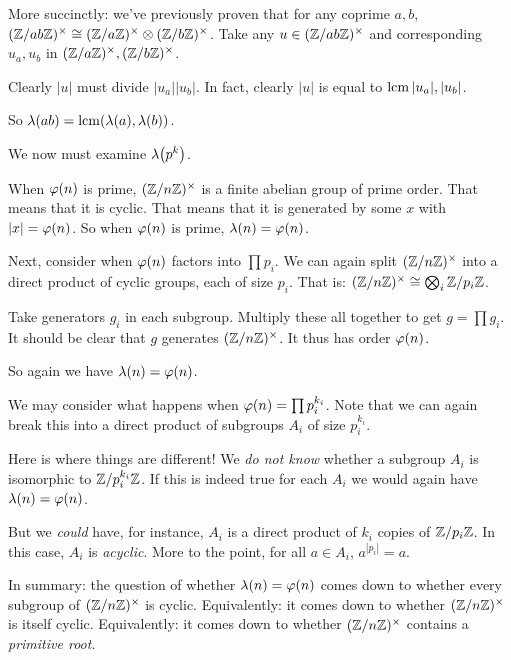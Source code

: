 \begin{remark}
  More succinctly: we've previously proven that for any coprime $a, b$,
  $\Zmodx{ab} \cong \Zmodx{a} \otimes \Zmodx{b}$. Take any $u \in
  \Zmodx{ab}$ and corresponding $u_a, u_b$ in $\Zmodx{a}, \Zmodx{b}$.

  Clearly $|u|$ must divide $|u_a||u_b|$. In fact, clearly $|u|$ is
  equal to $\lcm{|u_a|, |u_b|}$.

  So $\lambdaf{ab} = \lcmf{\lambdaf{a}, \lambdaf{b}}$.
\end{remark}

\begin{remark}
  We now must examine $\lambdaf{p^k}$.
\end{remark}

\begin{remark}
  When $\vphif{n}$ is prime, $\Zmodnx$ is a finite abelian group of
  prime order. That means that it is cyclic. That means that it is
  generated by some $x$ with $|x| = \vphif{n}$. So when $\vphif{n}$ is
  prime, $\lambda(n) = \vphif{n}$.
\end{remark}

\begin{remark}
  Next, consider when $\vphif{n}$ factors into $\prod p_i$. We can
  again split $\Zmodnx$ into a direct product of cyclic groups, each of
  size $p_i$. That is: $\Zmodnx \cong \bigotimes_i \Zmod{p_i}$.

  Take generators $g_i$ in each subgroup. Multiply these all together to
  get $g = \prod g_i$. It should be clear that $g$ generates $\Zmodnx$.
  It thus has order $\vphif{n}$.

  So again we have $\lambda(n) = \vphif{n}$.
\end{remark}

\begin{remark}
  We may consider what happens when $\vphif{n} = \prod p_i^{k_i}$. Note
  that we can again break this into a direct product of subgroups $A_i$
  of size $p_i^{k_i}$.

  Here is where things are different! We \emph{do not know} whether a
  subgroup $A_i$ is isomorphic to $\Zmod{p_i^{k_i}}$. If this is indeed
  true for each $A_i$ we would again have $\lambda(n) = \vphif{n}$.

  But we \emph{could} have, for instance, $A_i$ is a direct product of
  $k_i$ copies of $\Zmod{p_i}$. In this case, $A_i$ is \emph{acyclic}.
  More to the point, for all $a \in A_i$, $a^{|p_i|} = a$.

  In summary: the question of whether $\lambda(n) = \vphif{n}$ comes
  down to whether every subgroup of $\Zmodnx$ is cyclic. Equivalently:
  it comes down to whether $\Zmodnx$ is itself cyclic. Equivalently: it
  comes down to whether $\Zmodnx$ contains a \emph{primitive root}.
\end{remark}

